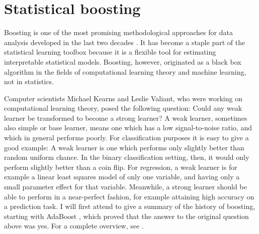 \chapter{Statistical boosting}
Boosting is one of the most promising methodological approaches for data analysis developed in the last two decades \citep{mayr14a}. It has become a staple part of the statistical learning toolbox because it is a flexible tool for estimating interpretable statistical models. Boosting, however, originated as a black box algorithm in the fields of computational learning theory and machine learning, not in statistics.

Computer scientists Michael Kearns and Leslie Valiant, who were working on computational learning theory, posed the following question: Could any weak learner be transformed to become a strong learner? \citep{kearnsvaliant} A weak learner, sometimes also simple or base learner, means one which has a low signal-to-noise ratio, and which in general performs poorly. For classification purposes it is easy to give a good example: A weak learner is one which performs only slightly better than random uniform chance. In the binary classification setting, then, it would only perform slightly better than a coin flip. For regression, a weak learner is for example a linear least squares model of only one variable, and having only a small parameter effect for that variable. Meanwhile, a strong learner should be able to perform in a near-perfect fashion, for example attaining high accuracy on a prediction task. I will first attend to give a summary of the history of boosting, starting with AdaBoost \citep{adaboost}, which proved that the answer to the original question above was yes. For a complete overview, see \citet{mayr14a, mayr14b, mayr17}.

